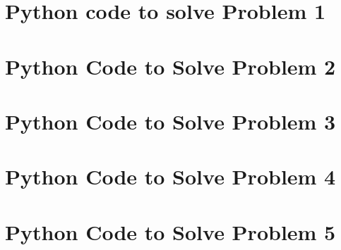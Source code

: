 \documentclass[12pt,letterpaper]{article}
\begin{document}






\appendix


\section[]{Python code to solve Problem 1} 
\label{sec:CodeHw01-1}


\newpage
\section[]{Python Code to Solve Problem 2} 
\label{sec:CodeHw01-2}


\newpage
\section[]{Python Code to Solve Problem 3} 
\label{sec:CodeHw01-3}


\newpage
\section[]{Python Code to Solve Problem 4} 
\label{sec:CodeHw01-4}


\newpage
\section[]{Python Code to Solve Problem 5} 
\label{sec:CodeHw01-5}

\end{document}
